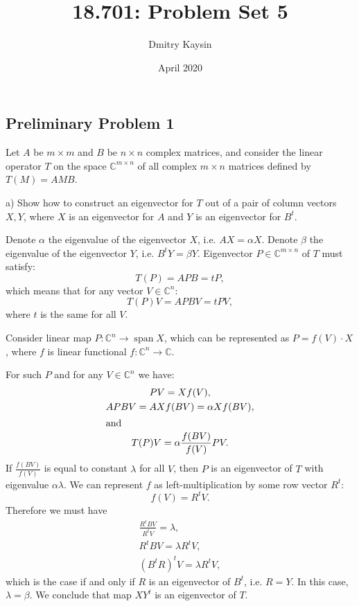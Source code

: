 \documentclass{article}
\title{18.701: Problem Set 5}
\author{Dmitry Kaysin}
\date{April 2020}
\theoremstyle{definition}
\DeclareMathOperator{\spn}{\operatorname{span}}
\newcommand{\C}{\mathbb{C}}
\begin{document}
\maketitle 


\subsection*{Preliminary Problem 1}

\begin{tcolorbox}
Let $A$ be $m \times m$ and $B$ be $n \times n$ complex matrices, and consider the linear operator $T$ on the space $\C^{m \times n}$ of all complex $m \times n$ matrices defined by $T(M) = AMB$.

a) Show how to construct an eigenvector for $T$ out of a pair of column vectors $X,Y$, where $X$ is an eigenvector for $A$ and $Y$ is an eigenvector for $B^t$.
\end{tcolorbox}

Denote $\alpha$ the eigenvalue of the eigenvector $X$, i.e. $AX = \alpha X$.
Denote $\beta$ the eigenvalue of the eigenvector $Y$, i.e. $B^t Y = \beta Y$.
Eigenvector $P \in \C^{m \times n}$ of $T$ must satisfy:
\[ T(P) = APB = t P, \]
which means that for any vector $V \in \C^n$:
\[ T(P) V = APB V = t P V, \]
where $t$ is the same for all $V$.

Consider linear map $P : \C^n \to \spn X$, which can be represented as $P = f(V) \cdot X$, where $f$ is linear functional $f : \C^n \to \C$.

For such $P$ and for any $V \in \C^n$ we have:
\begin{gather*}
    PV = X f(V), \\
    APBV 
    = A X f(BV) 
    = \alpha X f(BV), \\
    \intertext{and}
    T(P)V = \alpha \frac{f(BV)}{f(V)} PV.
\end{gather*}
If $\frac{f(BV)}{f(V)}$ is equal to constant $\lambda$ for all $V$, then $P$ is an eigenvector of $T$ with eigenvalue $\alpha \lambda$.
We can represent $f$ as left-multiplication by some row vector $R^t$:
\[ f(V) = R^t V. \]
Therefore we must have
\begin{gather*}
    \frac{R^t BV}{R^t V} = \lambda, \\
    R^t BV = \lambda R^t V, \\
    (B^t R)^t V = \lambda R^t V,
\end{gather*}
which is the case if and only if $R$ is an eigenvector of $B^t$, i.e. $R = Y$.
In this case, $\lambda = \beta$.
We conclude that map $X Y^t$ is an eigenvector of $T$.
\end{document}
